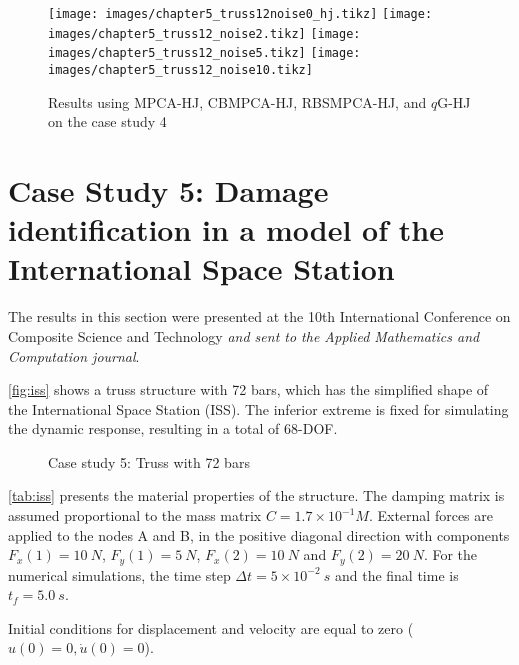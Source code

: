 
\begin{figure}[H]
\caption{Results using MPCA-HJ, CBMPCA-HJ, RBSMPCA-HJ, and $q$G-HJ on the case study 4}
\label{fig:resultstruss}
\centering
\texttt{[image: images/chapter5\_truss12noise0\_hj.tikz]}
\texttt{[image: images/chapter5\_truss12\_noise2.tikz]}
\texttt{[image: images/chapter5\_truss12\_noise5.tikz]}
\texttt{[image: images/chapter5\_truss12\_noise10.tikz]}
\end{figure}

\section{Case Study 5: Damage identification in a model of the International Space Station}

The results in this section were presented at the 10th International Conference on Composite Science and Technology \cite{HernandezTorres2015b} \textit{and sent to the Applied Mathematics and Computation journal}.

\autoref{fig:iss} shows a truss structure with 72 bars, which has the simplified shape of the International Space Station (ISS). The inferior extreme is fixed for simulating the dynamic response, resulting in a total of 68-DOF.

\begin{figure}[H]
    \caption{Case study 5: Truss with 72 bars}
    \label{fig:iss}
    \centering    
\end{figure}

\autoref{tab:iss} presents the material properties of the structure. The damping matrix is assumed proportional to the mass matrix $C = 1.7\times 10^{-1}M$. External forces are applied to the nodes A and B, in the positive diagonal direction with components $F_x(1) = 10~N$, $F_y(1) = 5~N$, $F_x(2) = 10~N$ and $F_y(2) = 20~N$. For the numerical simulations, the time step $\Delta t = 5 \times 10^{-2}~s$ and the final time is \mbox{$t_f = 5.0~s$}.

Initial conditions for displacement and velocity are equal to zero ($u(0) = 0, \dot u(0) = 0$).

